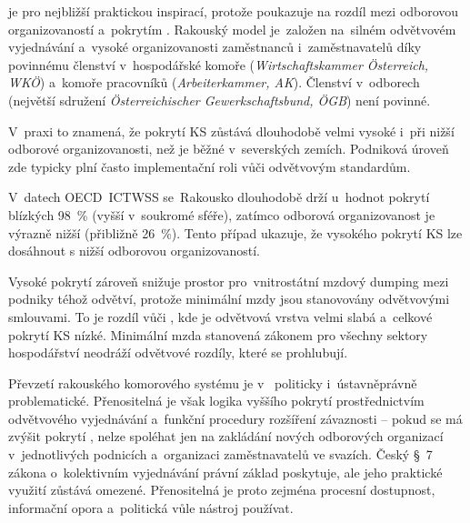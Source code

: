 je pro  nejbližší praktickou inspirací, protože poukazuje na rozdíl mezi odborovou organizovaností a~pokrytím .
Rakouský model je~založen na~silném odvětvovém vyjednávání a~vysoké organizovanosti zaměstnanců i~zaměstnavatelů díky povinnému
členství v~hospodářské komoře (\textit{Wirtschaftskammer Österreich, WKÖ}) a~komoře pracovníků (\textit{Arbeiterkammer, AK}).
Členství v~odborech (největší sdružení \textit{Österreichischer Gewerkschaftsbund, ÖGB}) není povinné.\par
V~praxi to znamená, že pokrytí \acs{KS} zůstává dlouhodobě velmi vysoké i~při nižší odborové
organizovanosti, než je běžné v~severských zemích. Podniková úroveň zde typicky
plní často implementační roli vůči odvětvovým standardům.\par

V~datech \acs{OECD}~\acs{ICTWSS} se~Rakousko dlouhodobě drží u~hodnot pokrytí
blízkých \SI{98}{\percent} (vyšší v~soukromé sféře), zatímco
odborová organizovanost je výrazně nižší (přibližně \SI{26}{\percent}).
Tento případ ukazuje, že vysokého pokrytí \acs{KS} lze dosáhnout s nižší odborovou organizovaností.\par

Vysoké pokrytí zároveň snižuje prostor pro~vnitrostátní mzdový dumping mezi
podniky téhož odvětví, protože minimální mzdy jsou stanovovány odvětvovými smlouvami.
To je rozdíl vůči , kde je odvětvová vrstva velmi slabá a~celkové pokrytí \acs{KS} nízké.
Minimální mzda stanovená zákonem pro všechny sektory hospodářství neodráží odvětvové rozdíly, které se prohlubují.\par

Převzetí rakouského komorového systému je v~ politicky i~ústavněprávně problematické. Přenositelná je však logika vyššího pokrytí prostřednictvím odvětvového vyjednávání a~funkční procedury rozšíření závaznosti -- pokud se má zvýšit pokrytí , nelze spoléhat jen na zakládání nových odborových organizací v~jednotlivých podnicích a~organizaci zaměstnavatelů ve svazích. Český \S~7 zákona o~kolektivním vyjednávání právní základ poskytuje, ale jeho praktické využití zůstává omezené. Přenositelná je proto zejména procesní dostupnost, informační opora a~politická vůle nástroj používat.~\cite{Eurofound_AT_Actors2024}~\cite{Eurofound_AT_CB2024}\par